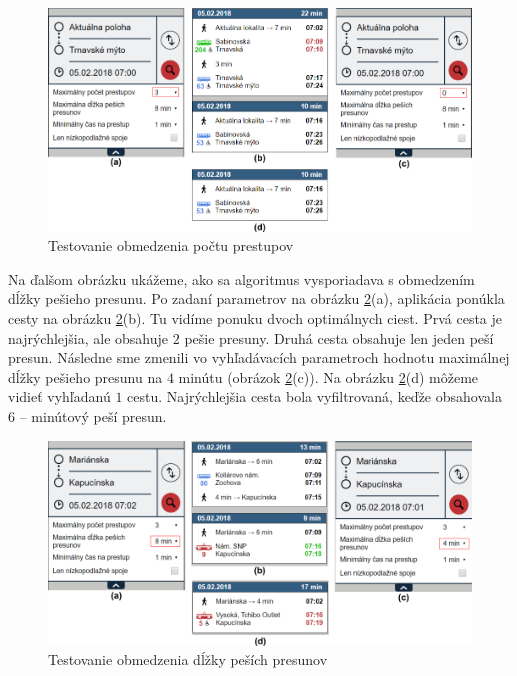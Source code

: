 \begin{figure}[H]
\centerline{\includegraphics[width=1.0\textwidth]{images/test/max-transfers-act}}
\caption[Testovanie obmedzenia počtu prestupov]{Testovanie obmedzenia počtu prestupov}
\label{fig:test-max-transfers}
\end{figure}

Na ďalšom obrázku ukážeme, ako sa algoritmus vysporiadava s obmedzením dĺžky pešieho presunu. Po zadaní parametrov na obrázku \ref{fig:test-max-walking}(a), aplikácia ponúkla cesty na obrázku \ref{fig:test-max-walking}(b). Tu vidíme ponuku dvoch optimálnych ciest. Prvá cesta je najrýchlejšia, ale obsahuje $2$ pešie presuny. Druhá cesta obsahuje len jeden peší presun. 
Následne sme zmenili vo vyhľadávacích parametroch hodnotu maximálnej dĺžky pešieho presunu na $4$ minútu (obrázok \ref{fig:test-max-walking}(c)). Na obrázku \ref{fig:test-max-walking}(d) môžeme vidieť vyhľadanú $1$ cestu. Najrýchlejšia cesta bola vyfiltrovaná, keďže obsahovala $6$ – minútový peší presun. 

\begin{figure}[H]
\centerline{\includegraphics[width=1.0\textwidth]{images/test/max-walking}}
\caption[Testovanie obmedzenia dĺžky peších presunov]{Testovanie obmedzenia dĺžky peších presunov}
\label{fig:test-max-walking}
\end{figure}

